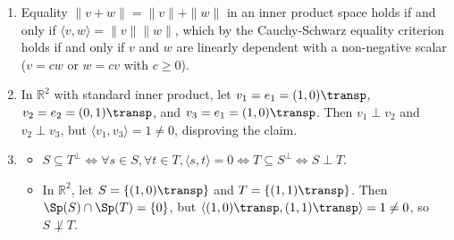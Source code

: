 \begin{exercisesolution}
\label{sol:orthogonality_unitary_true_false}
\begin{enumerate}[label=\textbf{(\alph*)}]
    \item Equality $\|v + w\| = \|v\| + \|w\|$ in an inner product space holds if and only if $\langle v, w \rangle = \|v\| \|w\|$, which by the Cauchy-Schwarz equality criterion holds if and only if $v$ and $w$ are linearly dependent with a non-negative scalar ($v = c w$ or $w = c v$ with $c \ge 0$).

    \item In $\mathbb{R}^2$ with standard inner product, let $v_1 = e_1 = (1, 0)\transp$, $v_2 = e_2 = (0, 1)\transp$, and $v_3 = e_1 = (1, 0)\transp$.
    Then $v_1 \perp v_2$ and $v_2 \perp v_3$, but $\langle v_1, v_3 \rangle = 1 \ne 0$, disproving the claim.

    \item \begin{itemize}
        \item $S \subseteq T^\perp \iff \forall s \in S, \forall t \in T, \langle s, t \rangle = 0 \iff T \subseteq S^\perp \iff S \perp T$.
        \item In $\mathbb{R}^2$, let $S = \{(1, 0)\transp\}$ and $T = \{(1, 1)\transp\}$.
        Then $\Sp(S) \cap \Sp(T) = \{0\}$, but $\langle (1, 0)\transp, (1, 1)\transp \rangle = 1 \ne 0$, so $S \not\perp T$.
    \end{itemize}


\end{enumerate}
\end{exercisesolution}

